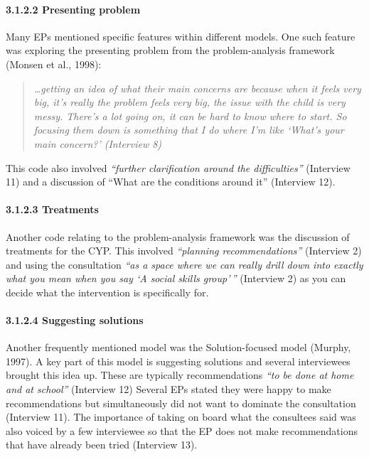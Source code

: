 \documentclass[
  english,
  man]{apa7}
\let\oldparagraph\paragraph
\renewcommand{\paragraph}[1]{\oldparagraph{#1}\mbox{}}
\begin{document}
\hypertarget{presenting-problem}{%
\paragraph{3.1.2.2 Presenting problem}\label{presenting-problem}}

Many EPs mentioned specific features within different models. One such feature was exploring the presenting problem from the problem-analysis framework (Monsen et al., 1998):

\begin{quote}
\emph{\ldots getting an idea of what their main concerns are because when it feels
very big, it's really the problem feels very big, the issue with the
child is very messy. There's a lot going on, it can be hard to know
where to start. So focusing them down is something that I do where I'm
like `What's your main concern?' (Interview 8)}
\end{quote}

This code also involved \emph{``further clarification around the difficulties''} (Interview 11) and a discussion of ``What are the conditions around it'' (Interview 12).

\hypertarget{treatments}{%
\paragraph{3.1.2.3 Treatments}\label{treatments}}

Another code relating to the problem-analysis framework was the discussion of treatments for the CYP. This involved \emph{``planning recommendations''} (Interview 2) and using the consultation \emph{``as a space where we can really drill down into exactly what you mean when you say `A social skills group'\,''} (Interview 2) as you can decide what the intervention is specifically for.

\hypertarget{suggesting-solutions}{%
\paragraph{3.1.2.4 Suggesting solutions}\label{suggesting-solutions}}

Another frequently mentioned model was the Solution-focused model (Murphy, 1997). A key part of this model is suggesting solutions and several interviewees brought this idea up. These are typically recommendations \emph{``to be done at home and at school''} (Interview 12) Several EPs stated they were happy to make recommendations but simultaneously did not want to dominate the consultation (Interview 11). The importance of taking on board what the consultees said was also voiced by a few interviewee so that the EP does not make recommendations that have already been tried (Interview 13).
\end{document}
